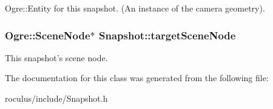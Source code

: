 \-Ogre\-::\-Entity for this snapshot. (\-An instance of the camera geometry). \hypertarget{classSnapshot_ab86c0038377f46c94957bf5634c74b03}{
\subsubsection[{target\-Scene\-Node}]{\setlength{\rightskip}{0pt plus 5cm}\-Ogre\-::\-Scene\-Node$\ast$ {\bf \-Snapshot\-::target\-Scene\-Node}}}\label{classSnapshot_ab86c0038377f46c94957bf5634c74b03}
\-This snapshot's scene node. 

\-The documentation for this class was generated from the following file\-:\begin{DoxyCompactItemize}
\item 
roculus/include/\-Snapshot.\-h\end{DoxyCompactItemize}
